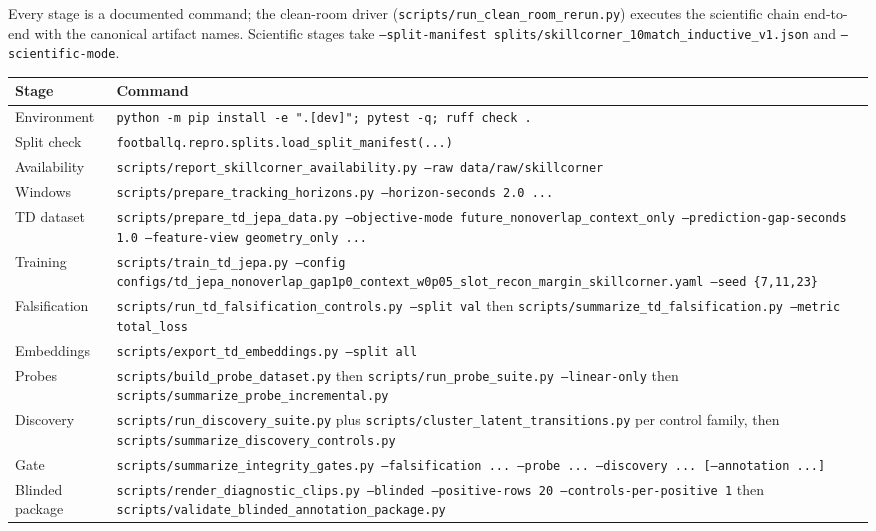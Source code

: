 Every stage is a documented command; the clean-room driver
(\texttt{scripts/run\_clean\_room\_rerun.py}) executes the scientific chain
end-to-end with the canonical artifact names. Scientific stages take
\texttt{--split-manifest splits/skillcorner\_10match\_inductive\_v1.json} and
\texttt{--scientific-mode}.

\begin{table}[h]
  \centering
  \small
  \begin{tabular}{lp{8.6cm}}
    \toprule
    Stage & Command \\
    \midrule
    Environment & \texttt{python -m pip install -e ".[dev]"; pytest -q; ruff check .} \\
    Split check & \texttt{footballq.repro.splits.load\_split\_manifest(...)} \\
    Availability & \texttt{scripts/report\_skillcorner\_availability.py --raw data/raw/skillcorner} \\
    Windows & \texttt{scripts/prepare\_tracking\_horizons.py --horizon-seconds 2.0 ...} \\
    TD dataset & \texttt{scripts/prepare\_td\_jepa\_data.py --objective-mode future\_nonoverlap\_context\_only --prediction-gap-seconds 1.0 --feature-view geometry\_only ...} \\
    Training & \texttt{scripts/train\_td\_jepa.py --config configs/td\_jepa\_nonoverlap\_gap1p0\_context\_w0p05\_slot\_recon\_margin\_skillcorner.yaml --seed \{7,11,23\}} \\
    Falsification & \texttt{scripts/run\_td\_falsification\_controls.py --split val} then \texttt{scripts/summarize\_td\_falsification.py --metric total\_loss} \\
    Embeddings & \texttt{scripts/export\_td\_embeddings.py --split all} \\
    Probes & \texttt{scripts/build\_probe\_dataset.py} then \texttt{scripts/run\_probe\_suite.py --linear-only} then \texttt{scripts/summarize\_probe\_incremental.py} \\
    Discovery & \texttt{scripts/run\_discovery\_suite.py} plus \texttt{scripts/cluster\_latent\_transitions.py} per control family, then \texttt{scripts/summarize\_discovery\_controls.py} \\
    Gate & \texttt{scripts/summarize\_integrity\_gates.py --falsification ... --probe ... --discovery ... [--annotation ...]} \\
    Blinded package & \texttt{scripts/render\_diagnostic\_clips.py --blinded --positive-rows 20 --controls-per-positive 1} then \texttt{scripts/validate\_blinded\_annotation\_package.py} \\

\end{tabular}
\end{table}
